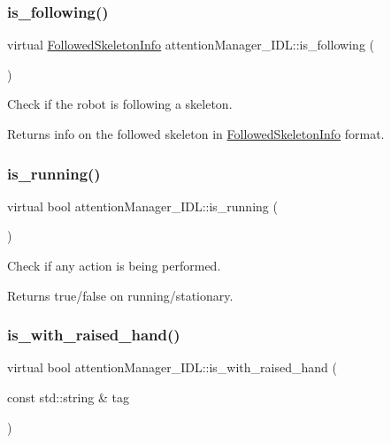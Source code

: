 \subsubsection{\texorpdfstring{is\+\_\+following()}{is\_following()}}
{\footnotesize\ttfamily virtual \hyperlink{classFollowedSkeletonInfo}{Followed\+Skeleton\+Info} attention\+Manager\+\_\+\+I\+D\+L\+::is\+\_\+following (\begin{DoxyParamCaption}{ }\end{DoxyParamCaption})\hspace{0.3cm}{\ttfamily [virtual]}}



Check if the robot is following a skeleton. 

\begin{DoxyReturn}{Returns}
info on the followed skeleton in \hyperlink{classFollowedSkeletonInfo}{Followed\+Skeleton\+Info} format. 
\end{DoxyReturn}
\mbox{\label{classattentionManager__IDL_ada750e5a7c6a0bb99be495e24d34dcdd}} 
\subsubsection{\texorpdfstring{is\+\_\+running()}{is\_running()}}
{\footnotesize\ttfamily virtual bool attention\+Manager\+\_\+\+I\+D\+L\+::is\+\_\+running (\begin{DoxyParamCaption}{ }\end{DoxyParamCaption})\hspace{0.3cm}{\ttfamily [virtual]}}



Check if any action is being performed. 

\begin{DoxyReturn}{Returns}
true/false on running/stationary. 
\end{DoxyReturn}
\mbox{\label{classattentionManager__IDL_aa6b2c971be0e878ab259675c83bba2dc}} 
\subsubsection{\texorpdfstring{is\+\_\+with\+\_\+raised\+\_\+hand()}{is\_with\_raised\_hand()}}
{\footnotesize\ttfamily virtual bool attention\+Manager\+\_\+\+I\+D\+L\+::is\+\_\+with\+\_\+raised\+\_\+hand (\begin{DoxyParamCaption}\item[{const std\+::string \&}]{tag }\end{DoxyParamCaption})\hspace{0.3cm}{\ttfamily [virtual]}}



